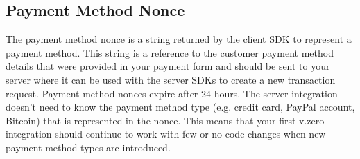 \subsection{Payment Method Nonce}
The payment method nonce is a string returned by the client SDK to represent a payment method. This string is a reference to the customer payment method details that were provided in your payment form and should be sent to your server where it can be used with the server SDKs to create a new transaction request.
\newline
Payment method nonces expire after 24 hours.
\newline
The server integration doesn't need to know the payment method type (e.g. credit card, PayPal account, Bitcoin) that is represented in the nonce. This means that your first v.zero integration should continue to work with few or no code changes when new payment method types are introduced.
